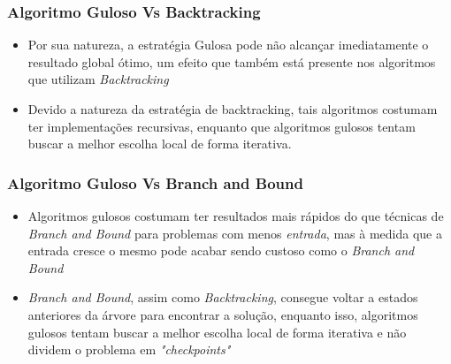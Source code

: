     \subsubsection{Algoritmo Guloso Vs Backtracking}

    \begin{itemize}
        \item Por sua natureza, a estratégia Gulosa pode não alcançar imediatamente 
        o resultado global ótimo, um efeito que também está presente nos algoritmos que utilizam \emph{Backtracking}
        \item Devido a natureza da estratégia de backtracking, tais algoritmos costumam ter 
        implementações recursivas, enquanto que algoritmos gulosos tentam 
        buscar a melhor escolha local de forma iterativa.
    \end{itemize}

    \subsubsection{Algoritmo Guloso Vs Branch and Bound}

    \begin{itemize}
        \item Algoritmos gulosos costumam ter resultados mais rápidos do que técnicas de 
        \emph{Branch and Bound} para problemas com menos \emph{entrada}, mas à medida que a entrada cresce o mesmo 
        pode acabar sendo custoso como o \emph{Branch and Bound}
        \item \emph{Branch and Bound}, assim como \emph{Backtracking}, consegue voltar a estados anteriores 
        da árvore para encontrar a solução, enquanto isso, algoritmos gulosos tentam 
        buscar a melhor escolha local de forma iterativa e não dividem o problema em \emph{"checkpoints"}
    \end{itemize}

    \nocite{greedy-algorithm}

\newpage